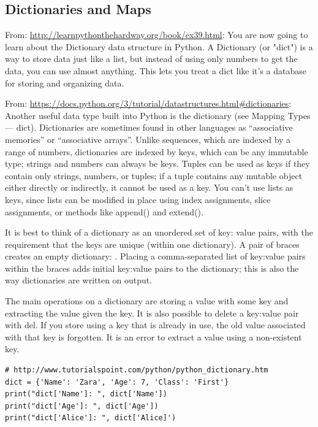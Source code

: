 \documentclass[11pt,a4paper]{article}
\begin{document}
\subsection{Dictionaries and Maps}
From:
\href{http://learnpythonthehardway.org/book/ex39.html}{http://learnpythonthehardway.org/book/ex39.html}:
You are now going to learn about the Dictionary data structure in
Python. A Dictionary (or "dict") is a way to store data just like a
list, but instead of using only numbers to get the data, you can use
almost anything. This lets you treat a dict like it's a database for
storing and organizing data.

From:
\href{https://docs.python.org/3/tutorial/datastructures.html\#dictionaries}{https://docs.python.org/3/tutorial/datastructures.html\#dictionaries}:
Another useful data type built into Python is the dictionary (see
Mapping Types — dict). Dictionaries are sometimes found in other
languages as “associative memories” or “associative arrays”. Unlike
sequences, which are indexed by a range of numbers, dictionaries are
indexed by keys, which can be any immutable type; strings and numbers
can always be keys. Tuples can be used as keys if they contain only
strings, numbers, or tuples; if a tuple contains any mutable object
either directly or indirectly, it cannot be used as a key. You can’t
use lists as keys, since lists can be modified in place using index
assignments, slice assignments, or methods like append() and extend().

It is best to think of a dictionary as an unordered set of key: value
pairs, with the requirement that the keys are unique (within one
dictionary). A pair of braces creates an empty dictionary: {}. Placing
a comma-separated list of key:value pairs within the braces adds
initial key:value pairs to the dictionary; this is also the way
dictionaries are written on output.

The main operations on a dictionary are storing a value with some key
and extracting the value given the key. It is also possible to delete
a key:value pair with del. If you store using a key that is already in
use, the old value associated with that key is forgotten. It is an
error to extract a value using a non-existent key.

\begin{lstlisting}
# http://www.tutorialspoint.com/python/python_dictionary.htm
dict = {'Name': 'Zara', 'Age': 7, 'Class': 'First'}
print("dict['Name']: ", dict['Name'])
print("dict['Age']: ", dict['Age'])
print("dict['Alice']: ", dict['Alice]')
\end{lstlisting}
\end{document}

